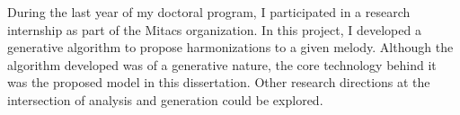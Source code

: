 
During the last year of my doctoral program, I participated
in a research internship as part of the Mitacs organization.
In this project, I developed a generative algorithm to
propose harmonizations to a given melody. Although the
algorithm developed was of a generative nature, the core
technology behind it was the proposed model in this
dissertation. Other research directions at the intersection
of analysis and generation could be explored.
